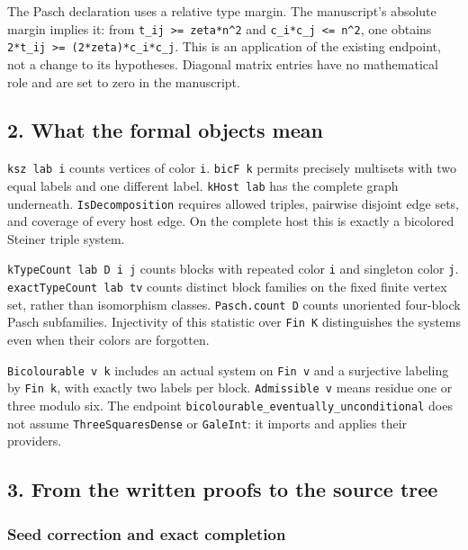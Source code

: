 \documentclass[english,11pt,a4paper]{article}
\begin{document}
The Pasch declaration uses a relative type margin. The manuscript's absolute margin implies it: from \texttt{t\_ij\ \textgreater{}=\ zeta*n\^{}2} and \texttt{c\_i*c\_j\ \textless{}=\ n\^{}2}, one obtains \texttt{2*t\_ij\ \textgreater{}=\ (2*zeta)*c\_i*c\_j}. This is an application of the existing endpoint, not a change to its hypotheses. Diagonal matrix entries have no mathematical role and are set to zero in the manuscript.

\subsection{2. What the formal objects mean}\label{what-the-formal-objects-mean}

\texttt{ksz\ lab\ i} counts vertices of color \texttt{i}. \texttt{bic\allowbreak{}F\ k} permits precisely multisets with two equal labels and one different label. \texttt{k\allowbreak{}Host\ lab} has the complete graph underneath. \texttt{Is\allowbreak{}Decomposition} requires allowed triples, pairwise disjoint edge sets, and coverage of every host edge. On the complete host this is exactly a bicolored Steiner triple system.

\texttt{k\allowbreak{}Type\allowbreak{}Count\ lab\ D\ i\ j} counts blocks with repeated color \texttt{i} and singleton color \texttt{j}. \texttt{exact\allowbreak{}Type\allowbreak{}Count\ lab\ tv} counts distinct block families on the fixed finite vertex set, rather than isomorphism classes. \texttt{Pasch.\allowbreak{}count\ D} counts unoriented four-block Pasch subfamilies. Injectivity of this statistic over \texttt{Fin\ K} distinguishes the systems even when their colors are forgotten.

\texttt{Bicolourable\ v\ k} includes an actual system on \texttt{Fin\ v} and a surjective labeling by \texttt{Fin\ k}, with exactly two labels per block. \texttt{Admissible\ v} means residue one or three modulo six. The endpoint \texttt{bicolourable\_\allowbreak{}eventually\_\allowbreak{}unconditional} does not assume \texttt{Three\allowbreak{}Squares\allowbreak{}Dense} or \texttt{Gale\allowbreak{}Int}: it imports and applies their providers.

\subsection{3. From the written proofs to the source tree}\label{from-the-written-proofs-to-the-source-tree}

\subsubsection{Seed correction and exact completion}\label{seed-correction-and-exact-completion}
\end{document}
